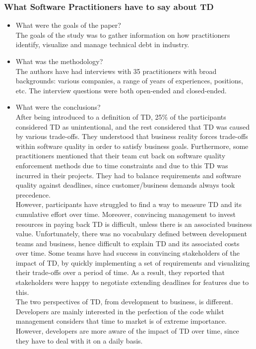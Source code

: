 \documentclass{mprop}
\begin{document}
\subsubsection{What Software Practitioners have to say about TD} \cite{Lim2012}
\begin{itemize}
\item What were the goals of the paper? \\
The goals of the study was to gather information on how practitioners identify, visualize and manage technical debt in industry.
\item What was the methodology? \\
The authors have had interviews with 35 practitioners with broad backgrounds: various companies, a range of years of experiences, positions, etc. 
The interview questions were both open-ended and closed-ended.
\item What were the conclusions? \\
After being introduced to a definition of TD, 25\% of the participants considered TD as unintentional, and the rest considered that TD was caused by various trade-offs. 
They understood that business reality forces trade-offs within software quality in order to satisfy business goals. 
Furthermore, some practitioners mentioned that their team cut back on software quality enforcement methods due to time constraints and due to this TD was incurred in their projects.
They had to balance requirements and software quality against deadlines, since customer/business demands always took precedence. \\

However, participants have struggled to find a way to measure TD and its cumulative effort over time.
Moreover, convincing management to invest resources in paying back TD is difficult, unless there is an associated business value. 
Unfortunately, there was no vocabulary defined between development teams and business, hence difficult to explain TD and its associated costs over time.
Some teams have had success in convincing stakeholders of the impact of TD, by quickly implementing a set of requirements and visualizing their trade-offs over a period of time. 
As a result, they reported that stakeholders were happy to negotiate extending deadlines for features due to this. \\

The two perspectives of TD, from development to business, is different. 
Developers are mainly interested in the perfection of the code whilst management considers that time to market is of extreme importance.
However, developers are more aware of the impact of TD over time, since they have to deal with it on a daily basis. \\


\end{itemize}
\end{document}
